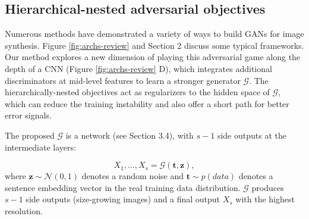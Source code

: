 \documentclass[10pt,twocolumn,letterpaper]{article}
\begin{document}
\subsection{Hierarchical-nested adversarial objectives}
Numerous methods have demonstrated a variety of ways to build GANs for image synthesis. Figure \ref{fig:archs-review} and Section 2 discuss some typical frameworks.
Our method explores a new dimension of playing this adversarial game along the depth of a CNN (Figure \ref{fig:archs-review} D), which integrates additional discriminators at mid-level features to learn a stronger generator $\mathcal{G}$. 
The hierarchically-nested objectives 
act as regularizers to the hidden space of $\mathcal{G}$, which can reduce the training instability and also offer a short path for better error signals.

The proposed $\mathcal{G}$ is a network (see Section 3.4), with $s{-}1$ side outputs at the intermediate layers:

\begin{equation}
\label{side}
X_1,..., X_s = \mathcal{G}(\bm t, \bm z), 
\end{equation}
where $\bm z\sim\mathcal{N}(0,1)$ denotes a random noise and $\bm t\sim p(data)$ denotes a sentence embedding vector in the real training data distribution. $\mathcal{G}$ produces $s-1$ side outputs (size-growing images) and a final output $X_s$ with the highest resolution.

\end{document}
